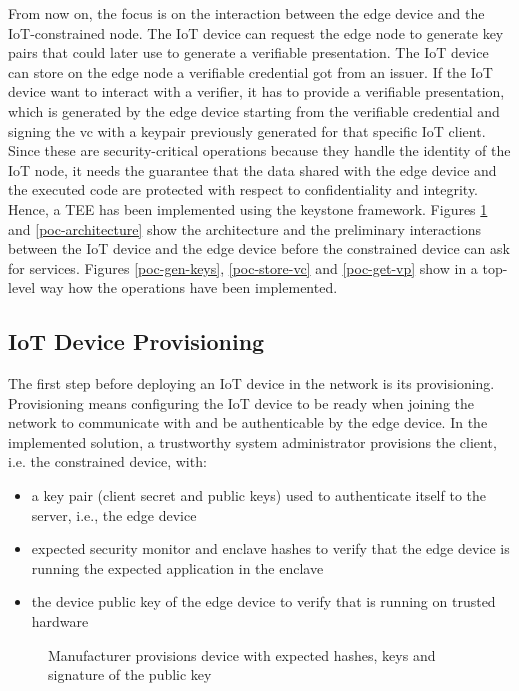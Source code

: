 From now on, the focus is on the interaction between the edge device and the IoT-constrained node. The IoT device can request the edge node to generate key pairs that could later use to generate a verifiable presentation. The IoT device can store on the edge node a verifiable credential got from an issuer. If the IoT device want to interact with a verifier, it has to provide a verifiable presentation, which is generated by the edge device starting from the verifiable credential and signing the vc with a keypair previously generated for that specific IoT client. 
Since these are security-critical operations because they handle the identity of the IoT node, it needs the guarantee that the data shared with the edge device and the executed code are protected with respect to confidentiality and integrity. Hence, a TEE has been implemented using the keystone framework.  Figures \ref{manufacturer-provisioning} and \ref{poc-architecture} show the architecture and the preliminary interactions between the IoT device and the edge device before the constrained device can ask for services. Figures \ref{poc-gen-keys}, \ref{poc-store-vc} and \ref{poc-get-vp} show in a top-level way how the operations have been implemented. 

\subsection{IoT Device Provisioning}

The first step before deploying an IoT device in the network is its provisioning. Provisioning means configuring the IoT device to be ready when joining the network to communicate with and be authenticable by the edge device. In the implemented solution, a trustworthy system administrator provisions the client, i.e. the constrained device, with: 
\begin{itemize}
    \item a key pair (client secret and public keys) used to authenticate itself to the server, i.e., the edge device
    \item expected security monitor and enclave hashes to verify that the edge device is running the expected application in the enclave 
    \item the device public key of the edge device to verify that is running on trusted hardware
\end{itemize} 

\begin{figure}[!h]
    \centering
    
    \caption{Manufacturer provisions device with expected hashes, keys and signature of the public key}
    \label{manufacturer-provisioning}
\end{figure}

